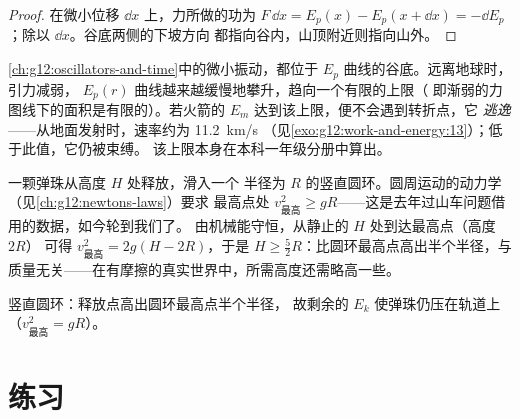 \begin{proof}
在微小位移 $\dd x$ 上，力所做的功为 $F\,\dd x = E_p(x) -
E_p(x + \dd x) = -\dd E_p$；除以 $\dd x$。谷底两侧的下坡方向
都指向谷内，山顶附近则指向山外。
\end{proof}

\begin{remark}[振动与逃逸]\label{rem:g12:work-and-energy:escape}
\cref{ch:g12:oscillators-and-time}中的微小振动，都位于
$E_p$ 曲线的谷底。远离地球时，引力减弱，
$E_p(r)$ 曲线越来越缓慢地攀升，趋向一个有限的上限（
即渐弱的力图线下的面积是有限的）。若火箭的 $E_m$
达到该上限，便不会遇到转折点，它
\emph{逃逸}——从地面发射时，速率约为 \qty{11.2}{km/s}
（见\cref{exo:g12:work-and-energy:13}）；低于此值，它仍被束缚。
该上限本身在本科一年级分册中算出。
\end{remark}

\begin{example}[竖直圆环]\label{ex:g12:work-and-energy:loop}
一颗弹珠从高度 $H$ 处释放，滑入一个
半径为 $R$ 的竖直圆环。圆周运动的动力学（见\cref{ch:g12:newtons-laws}）要求
最高点处 $v_{\text{最高}}^2 \geq gR$——这是去年过山车问题借用的数据，如今轮到我们了。
由机械能守恒，从静止的 $H$ 处到达最高点（高度 $2R$）
可得 $v_{\text{最高}}^2 = 2g(H - 2R)$，于是
$H \geq \tfrac52 R$：比圆环最高点高出半个半径，与
质量无关——在有摩擦的真实世界中，所需高度还需略高一些。
\end{example}

\begin{omfigure}

{\small 竖直圆环：释放点高出圆环最高点半个半径，
故剩余的 $E_k$ 使弹珠仍压在轨道上（$v_{\text{最高}}^2 = gR$）。}
\end{omfigure}

\section{练习}


